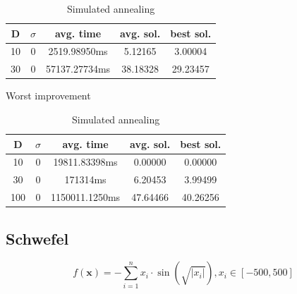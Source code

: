 \documentclass{article}
\begin{document}
\begin{table}[!htbp]
\begin{minipage}{.4\linewidth}
    \centering

    \begin{tabular}{|c|c|c|c|c|}
    \hline
    D   & $\sigma$  & avg. time     & avg. sol.     & best sol. \\
    \hline
    10  & 0         & 2519.98950ms  & 5.12165       & 3.00004 \\
    \hline
    30  & 0         & 57137.27734ms & 38.18328      & 29.23457 \\
    \hline
    \end{tabular}
    \caption{Worst improvement}
  \end{minipage}%
  \quad %
  \begin{minipage}{.75\linewidth}
    \centering

    \begin{tabular}{|c|c|c|c|c|}
    \hline
    D   & $\sigma$  & avg. time     & avg. sol.     & best sol. \\
    \hline
    10  & 0         & 19811.83398ms & 0.00000       & 0.00000 \\
    \hline
    30  & 0         & 171314ms      & 6.20453       & 3.99499 \\
    \hline
    100 & 0         & 1150011.1250ms& 47.64466      & 40.26256 \\
    \hline
    \end{tabular}
    \caption{Simulated annealing}
  \end{minipage}
\end{table}

\newpage
\setcounter{table}{0}


\subsection{Schwefel}
$$f(\mathbf{x}) = -\sum_{i=1}^{n} x_i \cdot \sin\left(\sqrt{|x_i|}\right) , x_i \in \left[-500,500\right]$$

\end{document}
